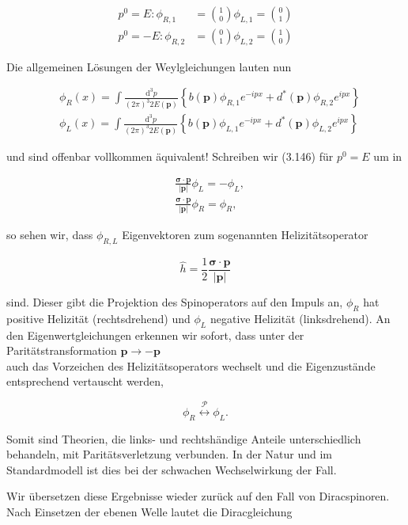 \documentclass[10pt, letterpaper]{article}
\begin{document}
$$
\begin{aligned}
p^{0}=E: \phi_{R, 1} & =\binom{1}{0} \phi_{L, 1}=\binom{0}{1} \\
p^{0}=-E: \phi_{R, 2} & =\binom{0}{1} \phi_{L, 2}=\binom{1}{0}
\end{aligned}
$$

Die allgemeinen Lösungen der Weylgleichungen lauten nun

$$
\begin{aligned}
& \phi_{R}(x)=\int \frac{\mathrm{d}^{3} p}{(2 \pi)^{3} 2 E(\mathbf{p})}\left\{b(\mathbf{p}) \phi_{R, 1} e^{-i p x}+d^{*}(\mathbf{p}) \phi_{R, 2} e^{i p x}\right\} \\
& \phi_{L}(x)=\int \frac{\mathrm{d}^{3} p}{(2 \pi)^{3} 2 E(\mathbf{p})}\left\{b(\mathbf{p}) \phi_{L, 1} e^{-i p x}+d^{*}(\mathbf{p}) \phi_{L, 2} e^{i p x}\right\}
\end{aligned}
$$

und sind offenbar vollkommen äquivalent! Schreiben wir (3.146) für $p^{0}=E$ um in

$$
\begin{aligned}
& \frac{\boldsymbol{\sigma} \cdot \mathbf{p}}{|\mathbf{p}|} \phi_{L}=-\phi_{L}, \\
& \frac{\boldsymbol{\sigma} \cdot \mathbf{p}}{|\mathbf{p}|} \phi_{R}=\phi_{R},
\end{aligned}
$$

so sehen wir, dass $\phi_{R, L}$ Eigenvektoren zum sogenannten Helizitätsoperator

$$
\hat{h}=\frac{1}{2} \frac{\boldsymbol{\sigma} \cdot \hat{\mathbf{p}}}{|\mathbf{p}|}
$$

sind. Dieser gibt die Projektion des Spinoperators auf den Impuls an, $\phi_{R}$ hat positive Helizität (rechtsdrehend) und $\phi_{L}$ negative Helizität (linksdrehend). An den Eigenwertgleichungen erkennen wir sofort, dass unter der Paritätstransformation $\mathbf{p} \rightarrow-\mathbf{p}$\\
auch das Vorzeichen des Helizitätsoperators wechselt und die Eigenzustände entsprechend vertauscht werden,

$$
\phi_{R} \stackrel{\mathcal{P}}{\longleftrightarrow} \phi_{L} .
$$

Somit sind Theorien, die links- und rechtshändige Anteile unterschiedlich behandeln, mit Paritätsverletzung verbunden. In der Natur und im Standardmodell ist dies bei der schwachen Wechselwirkung der Fall.

Wir übersetzen diese Ergebnisse wieder zurück auf den Fall von Diracspinoren. Nach Einsetzen der ebenen Welle lautet die Diracgleichung
\end{document}
